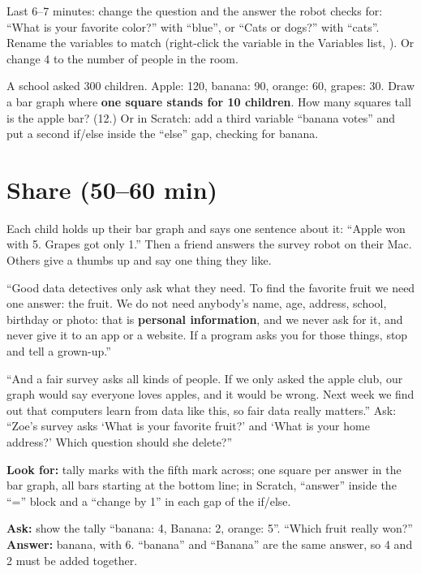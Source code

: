 \begin{freebuild}
Last 6--7 minutes: change the question and the answer the robot checks for: \enquote{What is your favorite color?} with \enquote{blue}, or \enquote{Cats or dogs?} with \enquote{cats}. Rename the variables to match (right-click the variable in the Variables list, ). Or change 4 to the number of people in the room.
\end{freebuild}

\begin{stretchchallenge}
A school asked 300 children. Apple: 120, banana: 90, orange: 60, grapes: 30. Draw a bar graph where \textbf{one square stands for 10 children}. How many squares tall is the apple bar? (12.) Or in Scratch: add a third variable \enquote{banana votes} and put a second if/else inside the \enquote{else} gap, checking for banana.
\end{stretchchallenge}

\section{Share (50--60 min)}
\begin{teacherscript}
Each child holds up their bar graph and says one sentence about it: \enquote{Apple won with 5. Grapes got only 1.} Then a friend answers the survey robot on their Mac. Others give a thumbs up and say one thing they like.
\end{teacherscript}

\begin{safety}
\enquote{Good data detectives only ask what they need. To find the favorite fruit we need one answer: the fruit. We do not need anybody's name, age, address, school, birthday or photo: that is \textbf{personal information}, and we never ask for it, and never give it to an app or a website. If a program asks you for those things, stop and tell a grown-up.}

\enquote{And a fair survey asks all kinds of people. If we only asked the apple club, our graph would say everyone loves apples, and it would be wrong. Next week we find out that computers learn from data like this, so fair data really matters.} Ask: \enquote{Zoe's survey asks \enquote{What is your favorite fruit?} and \enquote{What is your home address?} Which question should she delete?}
\end{safety}

\begin{formativecheck}
\textbf{Look for:} tally marks with the fifth mark across; one square per answer in the bar graph, all bars starting at the bottom line; in Scratch, \enquote{answer} inside the \enquote{=} block and a \enquote{change by 1} in each gap of the if/else.

\textbf{Ask:} show the tally \enquote{banana: 4, Banana: 2, orange: 5}. \enquote{Which fruit really won?}
\textbf{Answer:} banana, with 6. \enquote{banana} and \enquote{Banana} are the same answer, so 4 and 2 must be added together.
\end{formativecheck}

